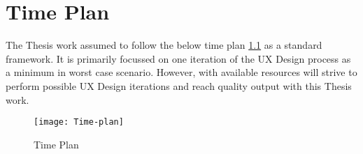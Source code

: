 \chapter{Time Plan}
\label{ch:timeplan}

The Thesis work assumed to follow the below time plan \ref{fig:time-plan} as a standard framework. It is primarily focussed on one iteration of the UX Design process as a minimum in worst case scenario. However, with available resources will strive to perform possible UX Design iterations and reach quality output with this Thesis work.

\begin{figure}[h]
	\texttt{[image: Time-plan]}
	\centering
	\caption{Time Plan}
	\label{fig:time-plan}
\end{figure}